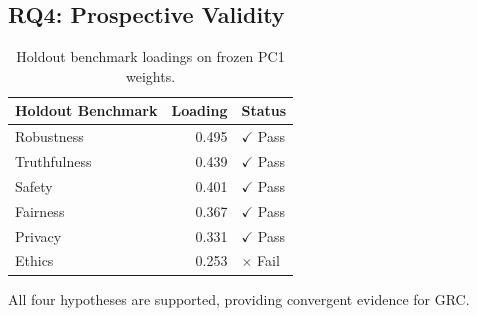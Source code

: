 \subsection{RQ4: Prospective Validity}

\begin{table}[h]
\centering
\caption{Holdout benchmark loadings on frozen PC1 weights.}
\label{tab:holdout}
\begin{tabular}{@{}lrl@{}}
\toprule
Holdout Benchmark & Loading & Status \\
\midrule
Robustness & 0.495 & $\checkmark$ Pass \\
Truthfulness & 0.439 & $\checkmark$ Pass \\
Safety & 0.401 & $\checkmark$ Pass \\
Fairness & 0.367 & $\checkmark$ Pass \\
Privacy & 0.331 & $\checkmark$ Pass \\
Ethics & 0.253 & $\times$ Fail \\
\bottomrule
\end{tabular}
\end{table}

All four hypotheses are supported, providing convergent evidence for GRC.

